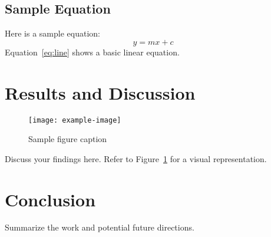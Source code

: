 \documentclass[runningheads]{llncs}
\begin{document}
\subsection{Sample Equation}
Here is a sample equation:
\begin{equation}
    y = mx + c
    \label{eq:line}
\end{equation}
Equation~\ref{eq:line} shows a basic linear equation.

\section{Results and Discussion}
\begin{figure}[h]
    \centering
    \texttt{[image: example-image]} %
    \caption{Sample figure caption}
    \label{fig:sample}
\end{figure}

Discuss your findings here. Refer to Figure~\ref{fig:sample} for a visual representation.

\section{Conclusion}
Summarize the work and potential future directions.


\end{document}

